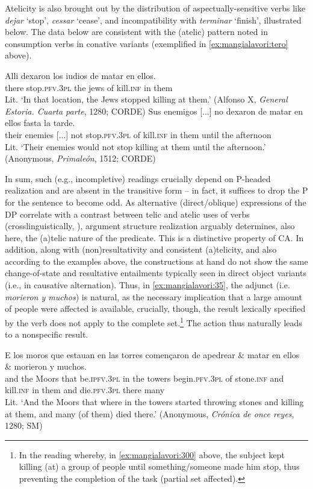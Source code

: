 \documentclass[output=paper,colorlinks,citecolor=brown,
]{langscibook}
\begin{document}
Atelicity is also brought out by the distribution of aspectually-sensitive verbs like \textit{dejar} ‘stop’, \textit{cessar} ‘cease’, and incompatibility with \textit{terminar} ‘finish’, illustrated below. The data below are consistent with the (atelic) pattern noted in consumption verbs in conative variants (exemplified in  \ref{ex:mangialavori:tero} above). 

\ea
  \ea 
    \gll Alli dexaron los iudios de matar en ellos.\\
 there stop.\textsc{pfv}.\textsc{3pl} the jews of kill.\textsc{inf} in them\\
    \glt Lit. ‘In that location, the Jews stopped killing at them.’ (Alfonso X, \textit{General Estoria. Cuarta parte}, 1280; CORDE)
  \ex 
    \gll Sus enemigos [...] no dexaron de matar en ellos fasta la tarde.\\
 their enemies [...] not stop.\textsc{pfv}.\textsc{3pl} of kill.\textsc{inf} in them until the afternoon\\
    \glt Lit. ‘Their enemies would not stop killing at them until the afternoon.’ (Anonymous, \textit{Primaleón}, 1512; CORDE)
  \z 
\z 

In sum, such (e.g., incompletive) readings crucially depend on P-headed realization and are absent in the transitive form -- in fact, it suffices to drop the P for the sentence to become odd. As alternative (direct/oblique) expressions of the DP correlate with a contrast between telic and atelic uses of verbs (crosslinguistically, \citealt{vanHout1996}), argument structure realization arguably determines, also here, the (a)telic nature of the predicate. This is a distinctive property of CA. In addition, along with (non)resultativity and consistent (a)telicity, and also according to the examples above, the constructions at hand do not show the same change-of-state and resultative entailments typically seen in direct object variants (i.e., in causative alternation). Thus, in  \ref{ex:mangialavori:35}, the adjunct (i.e. \textit{morieron y muchos}) is natural, as the necessary implication that a large amount of people were affected is available, crucially, though, the result lexically specified by the verb does not apply to the complete set.\footnote{In the reading whereby, in  \ref{ex:mangialavori:300} above, the subject kept killing (at) a group of people until something/someone made him stop, thus preventing the completion of the task (partial set affected).} The action thus naturally leads to a nonspecific result.

\ea\label{ex:mangialavori:35}
    \gll E los moros que estauan en las torres començaron de apedrear \& matar en ellos \& morieron y muchos.\\
and the Moors that be.\textsc{ipfv}.\textsc{3pl} in the towers begin.\textsc{pfv}.\textsc{3pl} of stone.\textsc{inf} and kill.\textsc{inf} in them and die.\textsc{pfv}.\textsc{3pl} there many\\
    \glt Lit. ‘And the Moors that where in the towers started throwing stones and killing at them, and many (of them) died there.’ (Anonymous, \textit{Crónica de once reyes}, 1280; SM)
\z
\end{document}

